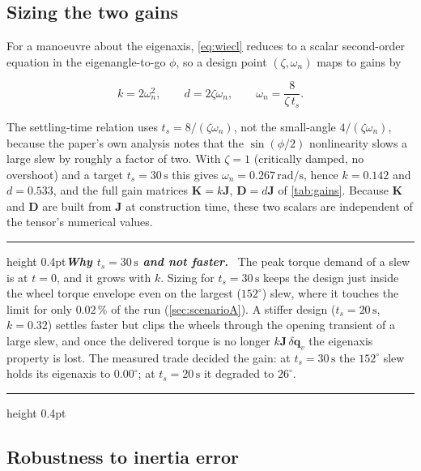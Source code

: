 \documentclass[conference,10pt,a4paper]{IEEEtran}
\newcommand{\remarkrule}{\par\nobreak\vspace{2pt}%
  \hrule height 0.4pt\vspace{4pt}\nobreak}
\newenvironment{keybox}[1][Result]
  {\par\medskip\remarkrule\noindent\small\textbf{\textit{#1.}}\ \ignorespaces}
  {\par\vspace{3pt}\hrule height 0.4pt\par\medskip\ignorespacesafterend}
\newenvironment{eqbox}{\ignorespaces}{\ignorespacesafterend}
\newcommand{\vect}[1]{\bm{#1}}
\newcommand{\mat}[1]{\bm{#1}}
\newcommand{\unit}[1]{\ensuremath{\,\mathrm{#1}}}
\begin{document}
\subsection{Sizing the two gains}
\label{sec:wiegains}

For a manoeuvre about the eigenaxis, \cref{eq:wiecl} reduces to a scalar
second-order equation in the eigenangle-to-go $\phi$, so a design point
$(\zeta,\omega_n)$ maps to gains by

\begin{eqbox}
\begin{equation}
k = 2\omega_n^2,
\qquad
d = 2\zeta\omega_n,
\qquad
\omega_n = \frac{8}{\zeta\,t_s}.
\label{eq:kdrule}
\end{equation}
\end{eqbox}

The settling-time relation uses $t_s=8/(\zeta\omega_n)$, not the small-angle
$4/(\zeta\omega_n)$, because the paper's own analysis notes that the
$\sin(\phi/2)$ nonlinearity slows a large slew by roughly a factor of two. With
$\zeta=1$ (critically damped, no overshoot) and a target $t_s=30\unit{s}$ this
gives $\omega_n=0.267\unit{rad/s}$, hence $k=0.142$ and $d=0.533$, and the
full gain matrices $\mat{K}=k\mat{J}$, $\mat{D}=d\mat{J}$ of \cref{tab:gains}.
Because $\mat{K}$ and $\mat{D}$ are built from $\mat{J}$ at construction time,
these two scalars are independent of the tensor's numerical values.

\begin{keybox}[Why $t_s=30\unit{s}$ and not faster]
The peak torque demand of a slew is at $t=0$, and it grows with $k$. Sizing
for $t_s=30\unit{s}$ keeps the design just inside the wheel torque envelope
even on the largest ($152^\circ$) slew, where it touches the limit for only
$0.02\,\%$ of the run (\cref{sec:scenarioA}). A stiffer design ($t_s=20\unit{s}$,
$k=0.32$) settles faster but clips the wheels through the opening transient of
a large slew, and once the delivered torque is no longer $k\mat{J}\,
\delta\vect{q}_v$ the eigenaxis property is lost. The measured trade decided
the gain: at $t_s=30\unit{s}$ the $152^\circ$ slew holds its eigenaxis to
$0.00^\circ$; at $t_s=20\unit{s}$ it degraded to $26^\circ$.
\end{keybox}

\subsection{Robustness to inertia error}
\label{sec:wierobust}
\end{document}
